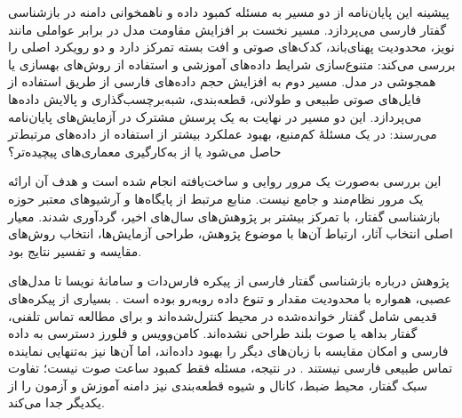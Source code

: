 
پیشینه این پایان‌نامه از دو مسیر به مسئله کمبود داده و ناهمخوانی دامنه در بازشناسی گفتار فارسی می‌پردازد. مسیر نخست بر افزایش مقاومت مدل در برابر عواملی مانند نویز، محدودیت پهنای‌باند، کدک‌های صوتی و افت بسته تمرکز دارد و دو رویکرد اصلی را بررسی می‌کند: متنوع‌سازی شرایط داده‌های آموزشی و استفاده از روش‌های بهسازی یا همجوشی در مدل. مسیر دوم به افزایش حجم داده‌های فارسی از طریق استفاده از فایل‌های صوتی طبیعی و طولانی، قطعه‌بندی، شبه‌برچسب‌گذاری و پالایش داده‌ها می‌پردازد. این دو مسیر در نهایت به یک پرسش مشترک در آزمایش‌های پایان‌نامه می‌رسند: در یک مسئلهٔ کم‌منبع، بهبود عملکرد بیشتر از استفاده از داده‌های مرتبط‌تر حاصل می‌شود یا از به‌کارگیری معماری‌های پیچیده‌تر؟

این بررسی به‌صورت یک مرور روایی و ساخت‌یافته انجام شده است و هدف آن ارائه یک مرور نظام‌مند و جامع نیست. منابع مرتبط از پایگاه‌ها و آرشیوهای معتبر حوزه بازشناسی گفتار، با تمرکز بیشتر بر پژوهش‌های سال‌های اخیر، گردآوری شدند. معیار اصلی انتخاب آثار، ارتباط آن‌ها با موضوع پژوهش، طراحی آزمایش‌ها، انتخاب روش‌های مقایسه و تفسیر نتایج بود.


پژوهش درباره بازشناسی گفتار فارسی از پیکره فارس‌دات و سامانهٔ نویسا تا مدل‌های عصبی، همواره با محدودیت مقدار و تنوع داده روبه‌رو بوده است . بسیاری از پیکره‌های قدیمی شامل گفتار خوانده‌شده در محیط کنترل‌شده‌اند و برای مطالعه تماس تلفنی، گفتار بداهه یا صوت بلند طراحی نشده‌اند. کامن‌وویس و فلورز دسترسی به داده فارسی و امکان مقایسه با زبان‌های دیگر را بهبود داده‌اند، اما آن‌ها نیز به‌تنهایی نماینده تماس طبیعی فارسی نیستند . در نتیجه، مسئله فقط کمبود ساعت صوت نیست؛ تفاوت سبک گفتار، محیط ضبط، کانال و شیوه قطعه‌بندی نیز دامنه آموزش و آزمون را از یکدیگر جدا می‌کند.

